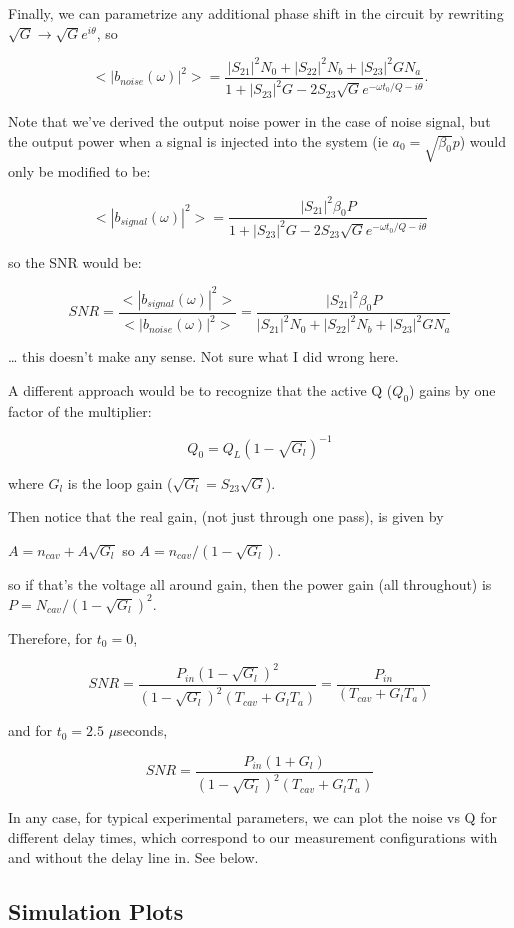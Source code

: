 \documentclass{article}
\begin{document}
Finally, we can parametrize any additional phase shift in the circuit by
rewriting \(\sqrt{G} \rightarrow \sqrt{G}e^{i\theta}\), so

\[
<|b_{noise}(\omega)|^2> = \frac{|S_{21}|^2 N_0 + |S_{22}|^2 N_b + |S_{23}|^2 G N_a}{1 + |S_{23}|^2 G - 2S_{23}\sqrt{G}e^{-\omega t_0/Q - i\theta}}.
\]

Note that we've derived the output noise power in the case of noise
signal, but the output power when a signal is injected into the system
(ie \(a_0 = \sqrt{\beta_0} p\)) would only be modified to be:

\[
<|b_{signal}(\omega)|^2> =\frac{|S_{21}|^2 \beta_0 P}{1 + |S_{23}|^2 G - 2S_{23}\sqrt{G}e^{-\omega t_0/Q - i\theta}}
\]

so the SNR would be:

\[
SNR = \frac{<|b_{signal}(\omega)|^2>}{<|b_{noise}(\omega)|^2>} = \frac{|S_{21}|^2 \beta_0 P}{|S_{21}|^2 N_0 + |S_{22}|^2 N_b + |S_{23}|^2 G N_a}
\]

\ldots{} this doesn't make any sense. Not sure what I did wrong here.

A different approach would be to recognize that the active Q (\(Q_0\))
gains by one factor of the multiplier:

\[
Q_0 = Q_L(1 - \sqrt{G_l})^{-1}
\]

where \(G_l\) is the loop gain (\(\sqrt{G_l} = S_{23}\sqrt{G}\)).

Then notice that the real gain, (not just through one pass), is given by

\(A = n_{cav} + A\sqrt{G_l}\) so \(A = n_{cav}/(1-\sqrt{G_l})\).

so if that's the voltage all around gain, then the power gain (all
throughout) is \(P = N_{cav}/(1-\sqrt{G_l})^2\).

Therefore, for \(t_0 = 0\),

\[
SNR = \frac{P_{in} ( 1- \sqrt{G_l})^2}{(1-\sqrt{G_l})^2 (T_{cav} + G_l T_a)} = \frac{P_{in}}{(T_{cav} + G_l T_a)}
\]

and for \(t_0 = 2.5\) \(\mu\)seconds,

\[
SNR = \frac{P_{in} ( 1 + G_l)}{(1-\sqrt{G_l})^2 (T_{cav} + G_l T_a)}
\]

In any case, for typical experimental parameters, we can plot the noise
vs Q for different delay times, which correspond to our measurement
configurations with and without the delay line in. See below.


    \subsection{Simulation Plots }
\end{document}

